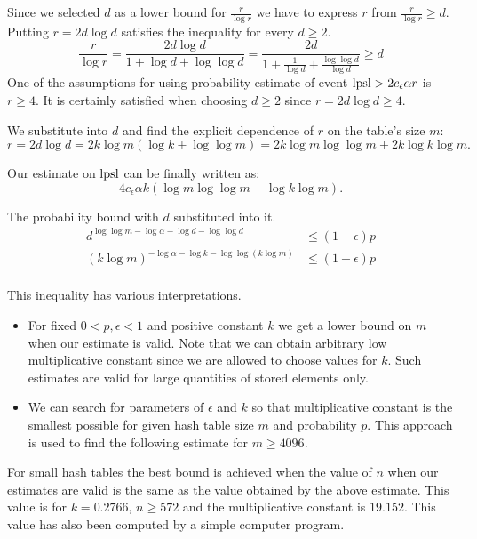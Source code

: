Since we selected $d$ as a lower bound for $\frac{r}{\log r}$ we have to express $r$ from $\frac{r}{\log r} \geq d$. Putting $r = 2 d \log d$ satisfies the inequality for every $d \geq 2$.
\begin{displaymath}
\frac{r}{\log r} = \frac{2 d \log d}{1 + \log d + \log \log d} = \frac{2 d}{1 + \frac{1}{\log d} + \frac{\log \log d}{\log d}} \geq d
\end{displaymath}
One of the assumptions for using probability estimate of event $\mathrm{lpsl} > 2 c_\epsilon \alpha r$ is $r \geq 4$. It is certainly satisfied when choosing $d \geq 2$ since $r = 2 d \log d \geq 4$.

We substitute into $d$ and find the explicit dependence of $r$ on the table's size $m$:
\begin{displaymath}
r = 2 d \log d = 2 k \log m (\log k + \log \log m) = 2 k \log m \log \log m + 2 k \log k \log m \text{.}
\end{displaymath}

Our estimate on $\mathrm{lpsl}$ can be finally written as:
\[
4 c_\epsilon \alpha k (\log m \log \log m + \log k \log m) \text{.}
\]

The probability bound with $d$ substituted into it.
\[
\begin{split}
d ^ {\log \log m - \log \alpha - \log d -\log \log d} & \leq (1 - \epsilon)p \\
\left(k \log m\right)^{-\log \alpha -\log k - \log \log (k \log m)} & \leq (1 - \epsilon)p \\
\end{split}
\]

This inequality has various interpretations.
\begin{itemize}
\item For fixed $0 < p, \epsilon < 1$ and positive constant $k$ we get a lower bound on $m$ when our estimate is valid. Note that we can obtain arbitrary low multiplicative constant since we are allowed to choose values for $k$. Such estimates are valid for large quantities of stored elements only.
\item We can search for parameters of $\epsilon$ and $k$ so that multiplicative constant is the smallest possible for given hash table size $m$ and probability $p$. This approach is used to find the following estimate for $m \geq 4096$.
\end{itemize}

For small hash tables the best bound is achieved when the value of $n$ when our estimates are valid is the same as the value obtained by the above estimate. This value is for $k = 0.2766$, $n \geq 572$ and the multiplicative constant is $19.152$. This value has also been computed by a simple computer program.

